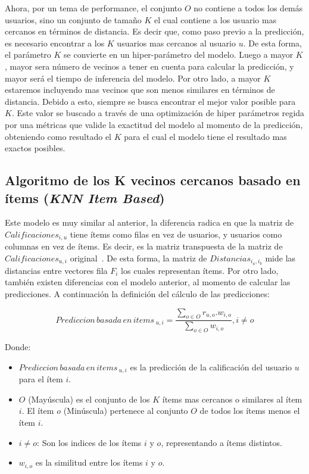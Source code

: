 \documentclass[11pt,a4paper,twoside]{thesis}
\begin{document}
Ahora, por un tema de performance, el conjunto $O$ no contiene a todos los
demás usuarios, sino un conjunto de tamaño $K$ el cual contiene a los usuario
mas cercanos en términos de distancia. Es decir que, como paso previo a la
predicción, es necesario encontrar a los $K$ usuarios mas cercanos al usuario
$u$. De esta forma, el parámetro $K$ se convierte en un hiper-parámetro del
modelo. Luego a mayor $K$, mayor sera número de vecinos a tener en cuenta para
calcular la predicción, y mayor será el tiempo de inferencia del modelo. Por
otro lado, a mayor $K$ estaremos incluyendo mas vecinos que son menos similares
en términos de distancia. Debido a esto, siempre se busca encontrar el mejor
valor posible para $K$. Este valor se buscado a través de una optimización de
hiper parámetros regida por una métricas que valide la exactitud del modelo al
momento de la predicción, obteniendo como resultado el $K$ para el cual el
modelo tiene el resultado mas exactos posibles.

\subsection{
	Algoritmo de los K vecinos cercanos basado en ítems
	(\textit{KNN Item Based})
}

Este modelo es muy similar al anterior, la diferencia radica en que la matriz
de $Calificaciones_{i, u}$ tiene ítems como filas en vez de usuarios, y
usuarios como columnas en vez de ítems. Es decir, es la matriz transpuesta de
la matriz de $Calificaciones_{u, i}$ original~\cite{useritembasedinference}. De
esta forma, la matriz de $Distancias_{i_a,i_b}$ mide las distancias entre
vectores fila $F_i$ los cuales representan ítems. Por otro lado, también
existen diferencias con el modelo anterior, al momento de calcular las
predicciones. A continuación la definición del cálculo de las predicciones:

\begin{equation}
	Prediccion \mspace{3mu}basada \mspace{3mu}en \mspace{3mu}items\mspace{3mu}_{u, i} = \frac{\sum_{o \in O} r_{u, o}. w_{i, o} }{\sum_{o \in O} w_{i, o} }, i \neq o
\end{equation}
\begin{description}
	\item[Donde:]
\end{description}
\begin{itemize}
	\item $Prediccion \mspace{3mu}basada \mspace{3mu}en \mspace{3mu}items\mspace{3mu}_{u, i}$
	      es la predicción de la calificación del usuario $u$ para el ítem $i$.
	\item $O$ (Mayúscula) es el conjunto de los $K$ ítems mas cercanos o similares
	      al ítem $i$. El ítem $o$ (Minúscula) pertenece al conjunto $O$ de todos
	      los ítems menos el ítem $i$.
	\item $i \neq o$: Son los indices de los ítems $i$ y $o$, representando a ítems distintos.
	\item $w_{i,o}$ es la similitud entre los ítems $i$ y $o$.
\end{itemize}
\end{document}
